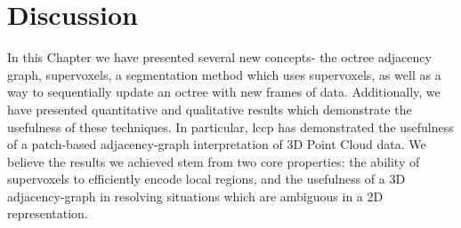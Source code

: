 \section{Discussion}

In this Chapter we have presented several new concepts- the octree adjacency graph, supervoxels, a segmentation method which uses supervoxels, as well as a way to sequentially update an octree with new frames of data. Additionally, we have presented quantitative and qualitative results which demonstrate the usefulness of these techniques. In particular, \gls{lccp} has demonstrated the usefulness of a patch-based adjacency-graph interpretation of 3D Point Cloud data. We believe the results we achieved stem from two core properties: the ability of supervoxels to efficiently encode local regions, and the usefulness of a 3D adjacency-graph in resolving situations which are ambiguous in a 2D representation.

